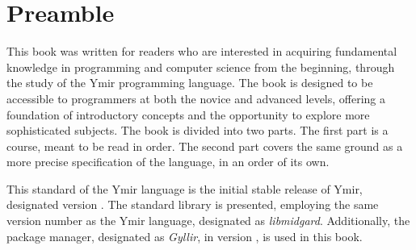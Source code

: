 \chapter*{Preamble}
\label{chap:preamble}

This book was written for readers who are interested in acquiring fundamental
knowledge in programming and computer science from the beginning, through the
study of the Ymir programming language. The book is designed to be accessible to
programmers at both the novice and advanced levels, offering a foundation of
introductory concepts and the opportunity to explore more sophisticated
subjects. The book is divided into two parts. The first part is a course, meant
to be read in order. The second part covers the same ground as a more precise
specification of the language, in an order of its own.

This standard of the Ymir language is the initial stable release of Ymir,
designated version \gycversion. The standard library is presented, employing the same
version number as the Ymir language, designated as \textit{libmidgard}.
Additionally, the package manager, designated as \textit{Gyllir}, in version
\gyllirversion, is used in this book.
